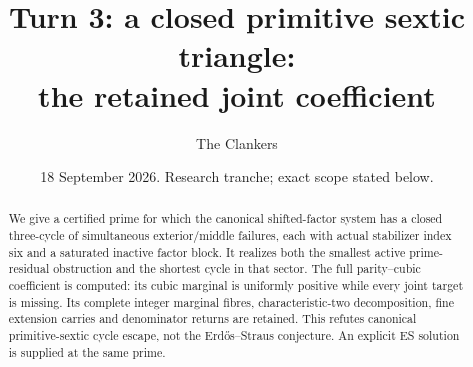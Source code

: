 \documentclass[10pt,reqno]{amsart}
\title{Turn 3: a closed primitive sextic triangle:\\ the retained joint coefficient}
\author{The Clankers}
\date{18 September 2026. Research tranche; exact scope stated below.}
\begin{document}
\begin{abstract}
We give a certified prime for which the canonical shifted-factor system has a
closed three-cycle of simultaneous exterior/middle failures, each with actual
stabilizer index six and a saturated inactive factor block. It realizes both the
smallest active prime-residual obstruction and the shortest cycle in that sector.
The full parity--cubic coefficient is computed: its cubic marginal is uniformly
positive while every joint target is missing. Its complete integer marginal
fibres, characteristic-two decomposition, fine extension carries and denominator
returns are retained. This refutes canonical primitive-sextic cycle escape, not
the Erd\H{o}s--Straus conjecture. An explicit ES solution is supplied at the same prime.
\end{abstract}
\maketitle


\end{document}
